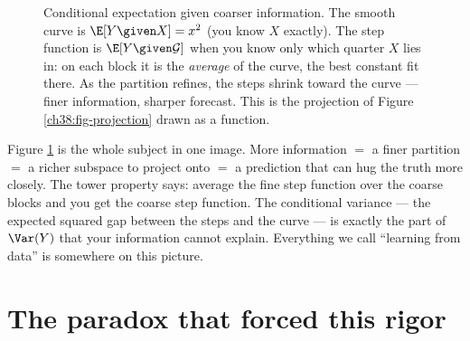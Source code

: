 \begin{figure}[H]
\centering
{}
\caption{Conditional expectation given coarser information. The smooth curve is $\E[Y\given X]=x^2$
(you know $X$ exactly). The step function is $\E[Y\given\mathcal{G}]$ when you know only which quarter
$X$ lies in: on each block it is the \emph{average} of the curve, the best constant fit there. As the
partition refines, the steps shrink toward the curve --- finer information, sharper forecast. This is
the projection of Figure \ref{ch38:fig-projection} drawn as a function.}
\label{ch38:fig-step}
\end{figure}

\begin{aestheticbox}
Figure \ref{ch38:fig-step} is the whole subject in one image. More information $=$ a finer partition
$=$ a richer subspace to project onto $=$ a prediction that can hug the truth more closely. The tower
property says: average the fine step function over the coarse blocks and you get the coarse step
function. The conditional variance --- the expected squared gap between the steps and the curve --- is
exactly the part of $\Var(Y)$ that your information cannot explain. Everything we call ``learning from
data'' is somewhere on this picture.
\end{aestheticbox}

\section{The paradox that forced this rigor}
\label{ch38:borel-kolmogorov}

